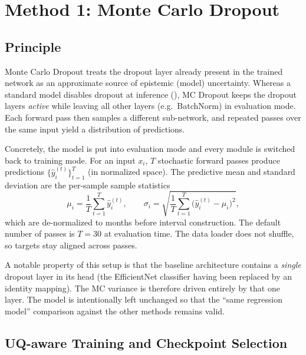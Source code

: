 \section{Method 1: Monte Carlo Dropout}
\label{sec:mcdropout}

\subsection{Principle}

Monte Carlo Dropout treats the dropout layer already present in the trained
network as an approximate source of epistemic (model) uncertainty. Whereas a
standard model disables dropout at inference (), MC Dropout
keeps the dropout layers \emph{active} while leaving all other layers (e.g.\
BatchNorm) in evaluation mode. Each forward pass then samples a different
sub-network, and repeated passes over the same input yield a distribution of
predictions.

Concretely, the model is put into evaluation mode and every 
module is switched back to training mode. For an input $x_i$, $T$ stochastic
forward passes produce predictions $\{\hat{y}_i^{(t)}\}_{t=1}^{T}$ (in normalized
space). The predictive mean and standard deviation are the per-sample sample
statistics
\begin{equation}
  \mu_i = \frac{1}{T}\sum_{t=1}^{T}\hat{y}_i^{(t)},
  \qquad
  \sigma_i = \sqrt{\frac{1}{T}\sum_{t=1}^{T}\big(\hat{y}_i^{(t)} - \mu_i\big)^{2}},
\end{equation}
which are de-normalized to months before interval construction. The default
number of passes is $T=30$ at evaluation time. The data loader does not shuffle,
so targets stay aligned across passes.

A notable property of this setup is that the baseline architecture contains a
\emph{single} dropout layer in its head (the EfficientNet classifier having been
replaced by an identity mapping). The MC variance is therefore driven entirely
by that one layer. The model is intentionally left unchanged so that the
``same regression model'' comparison against the other methods remains valid.

\subsection{UQ-aware Training and Checkpoint Selection}


